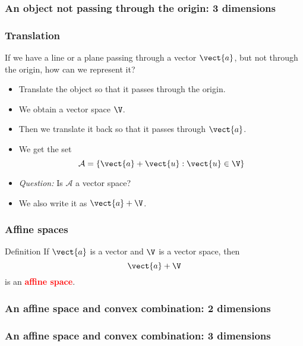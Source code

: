 \begin{frame}
  \frametitle{An object not passing through the origin: 3 dimensions}
\end{frame}

\begin{frame}
  \frametitle{Translation}

  If we have a line or a plane passing through a vector $\vect{a}$,
  but not through the origin, how can we represent it?

  \pause

  \begin{itemize}
  \item Translate the object so that it passes through the origin.
    \pause
  \item We obtain a vector space $\V$.
    \pause
  \item Then we translate it back so that it passes through $\vect{a}$.
    \pause
  \item We get the set
    \[
    {\mathcal A} = \{ \vect{a} + \vect{u} : \vect{u} \in \V \}
    \]
    \pause
  \item {\em Question:} Is $\mathcal A$ a vector space?
    \pause
  \item We also write it as $\vect{a} + \V$.
  \end{itemize}
\end{frame}

\begin{frame}
  \frametitle{Affine spaces}

  \begin{block}{Definition}
    If $\vect{a}$ is a vector and $\V$ is a vector space, then
    \[
    \vect{a} + \V
    \]
    is an \textcolor{red}{\bf affine space}.
  \end{block}
\end{frame}

\begin{frame}
  \frametitle{An affine space and convex combination: 2 dimensions}
\end{frame}

\begin{frame}
  \frametitle{An affine space and convex combination: 3 dimensions}
\end{frame}

